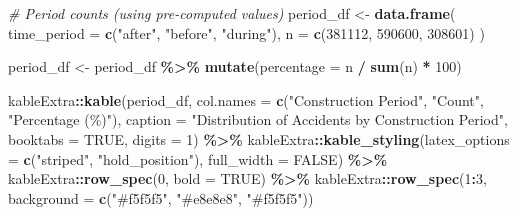 \documentclass[
]{article}
\newenvironment{Shaded}{\begin{snugshade}}{\end{snugshade}}
\newcommand{\AttributeTok}[1]{\textcolor[rgb]{0.13,0.29,0.53}{#1}}
\newcommand{\CommentTok}[1]{\textcolor[rgb]{0.56,0.35,0.01}{\textit{#1}}}
\newcommand{\ConstantTok}[1]{\textcolor[rgb]{0.56,0.35,0.01}{#1}}
\newcommand{\DecValTok}[1]{\textcolor[rgb]{0.00,0.00,0.81}{#1}}
\newcommand{\FunctionTok}[1]{\textcolor[rgb]{0.13,0.29,0.53}{\textbf{#1}}}
\newcommand{\NormalTok}[1]{#1}
\newcommand{\OtherTok}[1]{\textcolor[rgb]{0.56,0.35,0.01}{#1}}
\newcommand{\SpecialCharTok}[1]{\textcolor[rgb]{0.81,0.36,0.00}{\textbf{#1}}}
\newcommand{\StringTok}[1]{\textcolor[rgb]{0.31,0.60,0.02}{#1}}
\begin{document}
\begin{Shaded}
\begin{Highlighting}[]
\CommentTok{\# Period counts (using pre{-}computed values)}
\NormalTok{period\_df }\OtherTok{\textless{}{-}} \FunctionTok{data.frame}\NormalTok{(}
  \AttributeTok{time\_period =} \FunctionTok{c}\NormalTok{(}\StringTok{"after"}\NormalTok{, }\StringTok{"before"}\NormalTok{, }\StringTok{"during"}\NormalTok{),}
  \AttributeTok{n =} \FunctionTok{c}\NormalTok{(}\DecValTok{381112}\NormalTok{, }\DecValTok{590600}\NormalTok{, }\DecValTok{308601}\NormalTok{)}
\NormalTok{)}

\NormalTok{period\_df }\OtherTok{\textless{}{-}}\NormalTok{ period\_df }\SpecialCharTok{\%\textgreater{}\%}
  \FunctionTok{mutate}\NormalTok{(}\AttributeTok{percentage =}\NormalTok{ n }\SpecialCharTok{/} \FunctionTok{sum}\NormalTok{(n) }\SpecialCharTok{*} \DecValTok{100}\NormalTok{)}

\NormalTok{kableExtra}\SpecialCharTok{::}\FunctionTok{kable}\NormalTok{(period\_df, }
                 \AttributeTok{col.names =} \FunctionTok{c}\NormalTok{(}\StringTok{"Construction Period"}\NormalTok{, }\StringTok{"Count"}\NormalTok{, }\StringTok{"Percentage (\%)"}\NormalTok{),}
                 \AttributeTok{caption =} \StringTok{"Distribution of Accidents by Construction Period"}\NormalTok{,}
                 \AttributeTok{booktabs =} \ConstantTok{TRUE}\NormalTok{,}
                 \AttributeTok{digits =} \DecValTok{1}\NormalTok{) }\SpecialCharTok{\%\textgreater{}\%}
\NormalTok{  kableExtra}\SpecialCharTok{::}\FunctionTok{kable\_styling}\NormalTok{(}\AttributeTok{latex\_options =} \FunctionTok{c}\NormalTok{(}\StringTok{"striped"}\NormalTok{, }\StringTok{"hold\_position"}\NormalTok{),}
                           \AttributeTok{full\_width =} \ConstantTok{FALSE}\NormalTok{) }\SpecialCharTok{\%\textgreater{}\%}
\NormalTok{  kableExtra}\SpecialCharTok{::}\FunctionTok{row\_spec}\NormalTok{(}\DecValTok{0}\NormalTok{, }\AttributeTok{bold =} \ConstantTok{TRUE}\NormalTok{) }\SpecialCharTok{\%\textgreater{}\%}
\NormalTok{  kableExtra}\SpecialCharTok{::}\FunctionTok{row\_spec}\NormalTok{(}\DecValTok{1}\SpecialCharTok{:}\DecValTok{3}\NormalTok{, }\AttributeTok{background =} \FunctionTok{c}\NormalTok{(}\StringTok{"\#f5f5f5"}\NormalTok{, }\StringTok{"\#e8e8e8"}\NormalTok{, }\StringTok{"\#f5f5f5"}\NormalTok{))}
\end{Highlighting}
\end{Shaded}
\end{document}
